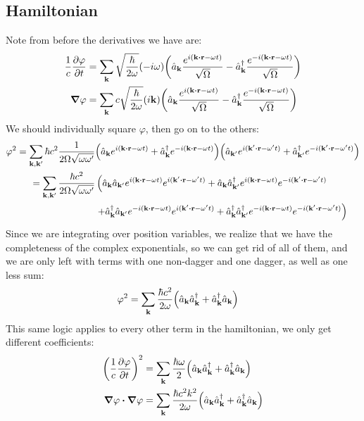 \documentclass[12pt]{article}
\begin{document}
\subsection{Hamiltonian}
Note from before the derivatives we have are:
\begin{align*}
  \frac1c\pdv{\varphi}{t}&=
  \sum_{\vb{k}}\sqrt{\frac{\hbar}{2\omega}}(-i\omega)
  \qty(\hat{a}_{\vb{k}}\frac{e^{i(\vb{k\vdot r}-\omega t)}}{\sqrt{\Omega}}
  -\hat{a}^\dag_{\vb{k}}\frac{e^{-i(\vb{k\vdot r}-\omega t)}}{\sqrt{\Omega}})\\
  \grad{\varphi}&=\sum_{\vb{k}}c\sqrt{\frac{\hbar}{2\omega}}(i\vb{k})
  \qty(\hat{a}_{\vb{k}}\frac{e^{i(\vb{k\vdot r}-\omega t)}}{\sqrt{\Omega}}
  -\hat{a}^\dag_{\vb{k}}\frac{e^{-i(\vb{k\vdot r}-\omega t)}}{\sqrt{\Omega}})
\end{align*}
We should individually square $\varphi$, then go on to the others:
\begin{align*}
  \varphi^2=\sum_{\vb{k},\vb{k}'}\hbar c^2\frac1{2\Omega\sqrt{\omega\omega'}}
  &\qty(\hat{a}_{\vb{k}}e^{i(\vb{k\vdot r}-\omega t)}
  +\hat{a}^\dag_{\vb{k}}e^{-i(\vb{k\vdot r}-\omega t)})
  \qty(\hat{a}_{\vb{k}'}e^{i(\vb{k'\vdot r}-\omega' t)}
  +\hat{a}^\dag_{\vb{k}'}e^{-i(\vb{k'\vdot r}-\omega' t)})\\
  =\sum_{\vb{k},\vb{k}'}\frac{\hbar c^2}{2\Omega\sqrt{\omega\omega'}}
  &\left(\hat{a}_{\vb{k}}\hat{a}_{\vb{k}'}
    e^{i(\vb{k\vdot r}-\omega t)}e^{i(\vb{k'\vdot r}-\omega' t)}+
    \hat{a}_{\vb{k}}\hat{a}^\dag_{\vb{k}'}
    e^{i(\vb{k\vdot r}-\omega t)}e^{-i(\vb{k'\vdot r}-\omega' t)}\right.\\
  &\left.+\hat{a}^\dag_{\vb{k}}\hat{a}_{\vb{k}'}
    e^{-i(\vb{k\vdot r}-\omega t)}e^{i(\vb{k'\vdot r}-\omega' t)}
    +\hat{a}^\dag_{\vb{k}}\hat{a}^\dag_{\vb{k}'}
    e^{-i(\vb{k\vdot r}-\omega t)}e^{-i(\vb{k'\vdot r}-\omega' t)}\right)
\end{align*}
Since we are integrating over position variables, we realize that we have the completeness of the complex exponentials, so we can get rid of all of them, and we are only left with terms with one non-dagger and one dagger, as well as one less sum:
\begin{align*}
  \varphi^2&=\sum_{\vb{k}}\frac{\hbar c^2}{2\omega}
  \qty(\hat{a}_{\vb{k}}\hat{a}^\dag_{\vb{k}}
  +\hat{a}^\dag_{\vb{k}}\hat{a}_{\vb{k}})
\end{align*}
This same logic applies to every other term in the hamiltonian, we only get different coefficients:
\begin{align*}
  \qty(\frac1c\pdv{\varphi}{t})^2&=
  \sum_{\vb{k}}\frac{\hbar \omega}{2}
  \qty(\hat{a}_{\vb{k}}\hat{a}^\dag_{\vb{k}}
  +\hat{a}^\dag_{\vb{k}}\hat{a}_{\vb{k}})\\
  \grad{\varphi}\vdot\grad{\varphi}&=
  \sum_{\vb{k}}\frac{\hbar c^2k^2}{2\omega}
  \qty(\hat{a}_{\vb{k}}\hat{a}^\dag_{\vb{k}}
  +\hat{a}^\dag_{\vb{k}}\hat{a}_{\vb{k}})
\end{align*}
\end{document}
